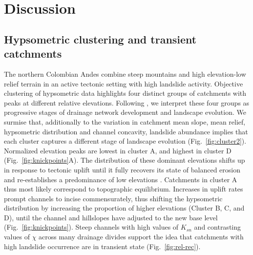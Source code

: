 \documentclass[draft]{agujournal2019}
\begin{document}

\section{Discussion}

\subsection{Hypsometric clustering and transient catchments}

\par The northern Colombian Andes combine steep mountains and high elevation-low relief terrain in an active tectonic setting with high landslide activity. Objective clustering of hypsometric data highlights four distinct groups of catchments with peaks at different relative elevations. Following \cite{Gallen2011}, we interpret these four groups as progressive stages of drainage network development and landscape evolution. We surmise that, additionally to the variation in catchment mean slope, mean relief, hypsometric distribution and channel concavity, landslide abundance implies that each cluster captures a different stage of landscape evolution (Fig.~\ref{fig:cluster2}). Normalized elevation peaks are lowest in cluster A, and highest in cluster D (Fig.~\ref{fig:knickpoints}A). The distribution of these dominant elevations shifts up in response to tectonic uplift until it fully recovers its state of balanced erosion and re-establishes a predominance of low elevations \cite{Gallen2011}. Catchments in cluster A thus most likely correspond to topographic equilibrium. Increases in uplift rates prompt channels to incise commensurately, thus shifting the hypsometric distribution by increasing the proportion of higher elevations (Cluster B, C, and D), until the channel and hillslopes have adjusted to the new base level (Fig.~\ref{fig:knickpoints}). Steep channels with high values of $K_{sn}$ and contrasting values of $\chi$ across many drainage divides support the idea that catchments with high landslide occurrence are in transient state (Fig.~\ref{fig:rel-rec}).
\end{document}
